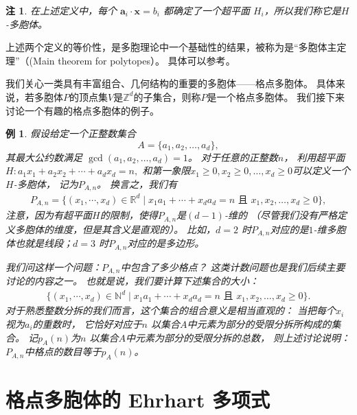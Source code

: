 \documentclass[12pt,a4paper]{ctexbook} %
\newcounter{theorem}[section]
\newtheorem{example}[theorem]{例}
\newtheorem{remark}[theorem]{注}
\numberwithin{figure}{section}
\theoremstyle{problemstyle}
\numberwithin{equation}{section} %
\begin{document}
\begin{remark}
在上述定义中，每个 $\mathbf{a}_i \cdot \mathbf{x} = b_i$ 都确定了一个超平面 $H_i$，所以我们称它是$H$-多胞体。
\end{remark}

上述两个定义的等价性，是多胞理论中一个基础性的结果，被称为是“多胞体主定理”（(Main theorem for polytopes）。
具体可以参考\cite[Chapter 1]{ZG12}。

我们关心一类具有丰富组合、几何结构的重要的多胞体——格点多胞体。
具体来说，若多胞体$P$的顶点集$V$是$\mathbb{Z}^d$的子集合，则称$P$是一个格点多胞体。
我们接下来讨论一个有趣的格点多胞体的例子。

\begin{example}
假设给定一个正整数集合 \[A = \{a_1, a_2, \ldots, a_d\},\]
其最大公约数满足 $\gcd(a_1, a_2, \ldots, a_d) = 1$。
对于任意的正整数$n$，
利用超平面
\(H\colon a_1x_1+a_2x_2+\cdots + a_dx_d = n,\)
和第一象限$x_1 \geq 0, x_2 \geq 0, \ldots, x_d \geq 0$可以定义一个$H$-多胞体，
记为$P_{A,n}$。
换言之，我们有
\begin{align*}
 P_{A,n}=\{(x_1,\cdots,x_d)\in\mathbb{R}^d\mid x_1a_1+\cdots+x_da_d=n \,\, \text{且} \,\, x_1, x_2 , \ldots, x_d \geq 0 \},
\end{align*}
注意，因为有超平面$H$的限制，使得$P_{A,n}$是$(d-1)$-维的
（尽管我们没有严格定义多胞体的维度，但是其含义是直观的）。
比如，$d=2$ 时$P_{A,n}$对应的是$1$-维多胞体也就是线段；$d=3$ 时$P_{A,n}$对应的是多边形。

我们问这样一个问题：$P_{A,n}$中包含了多少格点？
这类计数问题也是我们后续主要讨论的内容之一。
也就是说，我们要计算下述集合的大小：
\begin{align}\label{eq:lp}
\{(x_1,\cdots,x_d)\in\mathbb{N}^d\mid x_1a_1+\cdots+x_da_d=n \,\, \text{且} \,\, x_1, x_2 , \ldots, x_d \geq 0 \}.
\end{align}
对于熟悉整数分拆的我们而言，这个集合的组合意义是相当直观的：
当把每个$ x_i $视为$a_i $的重数时，
它恰好对应于$ n $ 以集合$ A $中元素为部分的受限分拆所构成的集合。
记$p_A(n)$为$ n $ 以集合$ A $中元素为部分的受限分拆的总数，
则上述讨论说明：$P_{A,n}$中格点的数目等于$p_A(n)$。
\end{example}



\section{格点多胞体的 Ehrhart 多项式}
\end{document}
